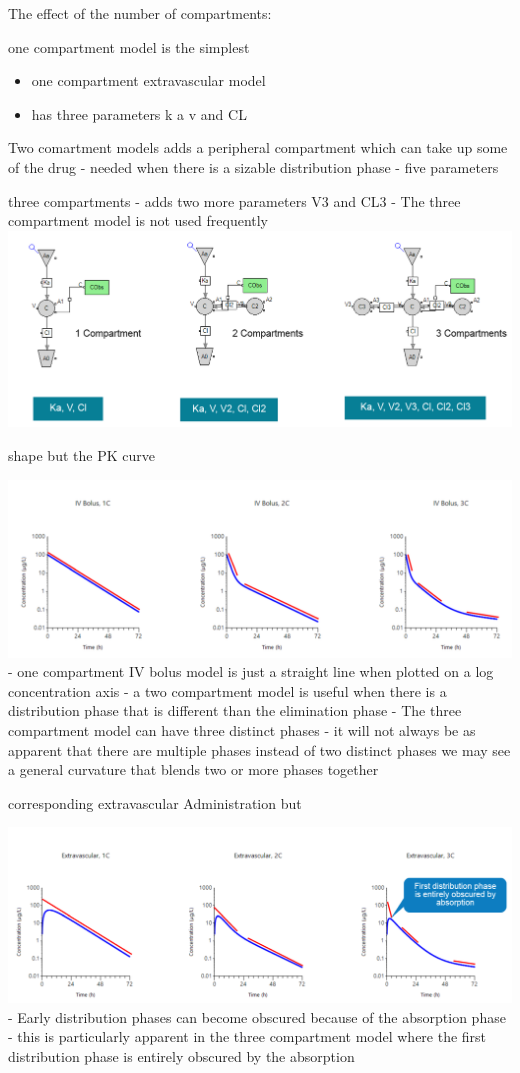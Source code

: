 \documentclass[
  letterpaper,
  DIV=11,
  numbers=noendperiod]{scrreprt}
\providecommand{\tightlist}{%
  \setlength{\itemsep}{0pt}\setlength{\parskip}{0pt}}\usepackage{longtable,booktabs,array}
\begin{document}
The effect of the number of compartments:

one compartment model is the simplest

\begin{itemize}
\tightlist
\item
  one compartment extravascular model
\item
  has three parameters k a v and CL
\end{itemize}

Two comartment models adds a peripheral compartment which can take up
some of the drug - needed when there is a sizable distribution phase -
five parameters

three compartments - adds two more parameters V3 and CL3 - The three
compartment model is not used frequently
\includegraphics{./img/structure-1.png}

shape but the PK curve

\includegraphics{./img/structure-2.png} - one compartment IV bolus model
is just a straight line when plotted on a log concentration axis - a two
compartment model is useful when there is a distribution phase that is
different than the elimination phase - The three compartment model can
have three distinct phases - it will not always be as apparent that
there are multiple phases instead of two distinct phases we may see a
general curvature that blends two or more phases together

corresponding extravascular Administration but

\includegraphics{./img/structure-3.png} - Early distribution phases can
become obscured because of the absorption phase - this is particularly
apparent in the three compartment model where the first distribution
phase is entirely obscured by the absorption
\end{document}
